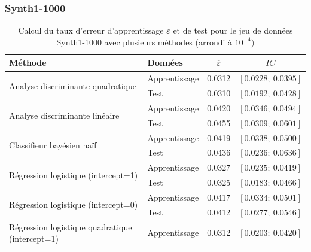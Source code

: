 \documentclass{article}
\begin{document}
\subsubsection{Synth1-1000}

\begin{table}[H]
\centering
\caption{Calcul du taux d'erreur d'apprentissage $\varepsilon$ et de test pour le jeu de données Synth1-1000 avec plusieurs méthodes (arrondi à $10^{-4})$}
\begin{tabular}{l|l|cc}
\multicolumn{1}{l|}{\textbf{Méthode}}    & \textbf{Données} &$ \overline{\varepsilon}$ & $IC$                      \\ \hline
\multirow{2}{*}{Analyse discriminante quadratique} & Apprentissage    & 0.0312                   & $\left[0.0228 ;~ 0.0395 \right]$  \\
                                       & Test             & 0.0310             & $\left[0.0192  ;~ 0.0428 \right]$ \\ \hline
\multirow{2}{*}{Analyse discriminante linéaire}                  & Apprentissage & 0.0420                                 & $\left[0.0346 ;~ 0.0494 \right]$  \\
                                       & Test             & 0.0455                       & $\left[0.0309  ;~ 0.0601 \right]$ \\ \hline
\multirow{2}{*}{Classifieur bayésien naïf}                  & Apprentissage    & 0.0419                             & $\left[0.0338 ;~ 0.0500 \right]$  \\
                                       & Test             & 0.0436                                 & $\left[0.0236 ;~ 0.0636 \right]$ \\ \hline
\multirow{2}{*}{Régression logistique (intercept=1)}                  & Apprentissage    & 0.0327                             & $\left[0.0235 ;~ 0.0419 \right]$  \\
                                       & Test             & 0.0325                                 & $\left[0.0183;~ 0.0466 \right]$ \\ \hline
\multirow{2}{*}{Régression logistique (intercept=0)}                  & Apprentissage    & 0.0417                           & $\left[0.0334 ;~ 0.0501\right]$  \\
                                       & Test             & 0.0412                                & $\left[0.0277 ;~ 0.0546 \right]$ \\ \hline
\multirow{2}{*}{Régression logistique quadratique (intercept=1)}                  & Apprentissage    & 0.0312                            & $\left[0.0203 ;~ 0.0420 \right]$  \\

\end{tabular}
\end{table}
\end{document}
